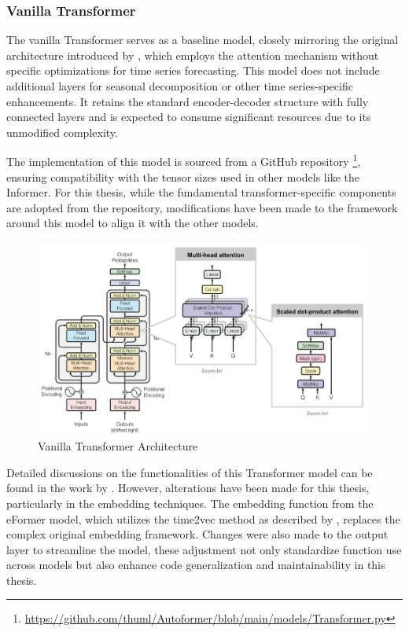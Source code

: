 \documentclass{article}
\begin{document}
\subsubsection{Vanilla Transformer}

The vanilla Transformer serves as a baseline model, closely mirroring the original architecture introduced by \cite{vanilla-transformer}, which employs the attention mechanism without specific optimizations for time series forecasting. This model does not include additional layers for seasonal decomposition or other time series-specific enhancements. It retains the standard encoder-decoder structure with fully connected layers and is expected to consume significant resources due to its unmodified complexity.

The implementation of this model is sourced from a GitHub repository \footnote{\url{https://github.com/thuml/Autoformer/blob/main/models/Transformer.py}}, ensuring compatibility with the tensor sizes used in other models like the Informer. For this thesis, while the fundamental transformer-specific components are adopted from the repository, modifications have been made to the framework around this model to align it with the other models.

\begin{figure}
    \centering
    \includegraphics[width=\linewidth]{graphs/models/VanillaTransformer.png}
    \caption{Vanilla Transformer Architecture}
    \label{fig:VanillaTransformer_architecture}
\end{figure}

Detailed discussions on the functionalities of this Transformer model can be found in the work by \cite{vanilla-transformer}. However, alterations have been made for this thesis, particularly in the embedding techniques. The embedding function from the eFormer model, which utilizes the time2vec method as described by \cite{time2vec}, replaces the complex original embedding framework. Changes were also made to the output layer to streamline the model, these adjustment not only standardize function use across models but also enhance code generalization and maintainability in this thesis.
\end{document}
